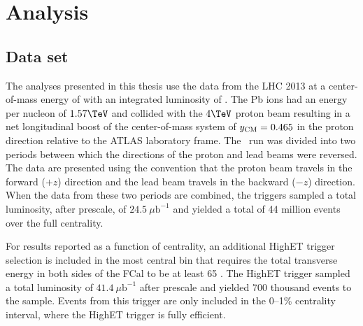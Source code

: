 \chapter{Analysis}
\label{ch:analysis}
\graphicspath{{Chapter-Analysis/figures/}}

\section{Data set}

The analyses presented in this thesis use the data from the \ac{LHC} 2013 \pPb at a center-of-mass energy of \pPbenergy with an integrated luminosity of \pPblumi.
The Pb ions had an energy per nucleon of $1.57 \TeV$ and collided with the $4 \TeV$ proton beam resulting in a net longitudinal boost of the center-of-mass system of $y_{\mathrm{CM}} = 0.465$ in the proton direction relative to the ATLAS laboratory frame.
The \pPb\ run was divided into two periods between which the directions of the proton and lead beams were
reversed. 
The data are presented using the convention that the proton beam travels in the forward ($+z$) direction and the lead beam travels in the backward ($-z$) direction.
When the data from these two periods are combined, the \minbias triggers sampled a total luminosity, after prescale, of $24.5~\mu\textrm{b}^{-1}$ and yielded a total of 44 million events over the full centrality.

For results reported as a function of centrality, an additional \ac{HighET} trigger selection is included in the most central bin that requires the total transverse energy in both sides of the \ac{FCal} to be at least 65 \GeV.
The \ac{HighET} trigger sampled a total luminosity of $41.4~\mu\textrm{b}^{-1}$ after prescale and yielded 700 thousand events to the sample.
Events from this trigger are only included in the 0--1\% centrality interval, where the \ac{HighET} trigger is fully efficient.

